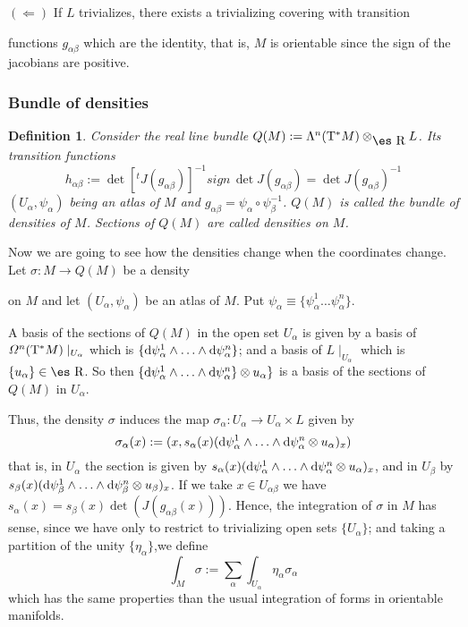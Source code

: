 \documentclass[12pt]{article}
\theoremstyle{plain}
\newtheorem{definition}{Definition}
\def\qed{\ifvmode\removelastskip\fi
{\unskip\nobreak\hfil\penalty50\hbox{}\nobreak\hfil
\hbox{\vrule height1.2ex width1.2ex}\parfillskip=0pt
\finalhyphendemerits=0 \par\smallskip}}
\def\d{{\rm d}}
\def\Real{\mbox{\es R}}
\def\Tan{{\rm T}}
\begin{document}
$(\Longleftarrow)$ \quad
If $L$ trivializes, there exists a trivializing covering with transition

functions
$g_{\alpha \beta}$ which are the identity, that is, $M$ is orientable
since the sign of the jacobians are positive.
\qed


\subsubsection{Bundle of densities}


\begin{definition}
Consider the real line bundle $Q(M) := \Lambda^n(\Tan^* M)
\otimes_{\Real} L$.
Its transition functions
$$
h_{\alpha \beta} :=
\det [^tJ(g_{\alpha \beta})]^{-1} sign\, \det J(g_{\alpha \beta})=
\det J(g_{\alpha \beta})^{-1}
$$
$(U_{\alpha},\psi_{\alpha})$ being an atlas of $M$ and
$g_{\alpha \beta} = \psi_{\alpha} \circ \psi_{\beta}^{-1}$.
$Q(M)$ is called the {\rm bundle of densities} of $M$.
Sections of $Q(M)$ are called {\rm densities} on $M$.
\label{dens}
\end{definition}

Now we are going to see how the densities change
when the coordinates change. Let $\sigma \colon M \to Q(M)$ be a density

on $M$
and let $(U_{\alpha},\psi_{\alpha})$ be an atlas of $M$.
Put $\psi_{\alpha} \equiv \{ \psi_{\alpha}^1 \ldots \psi_{\alpha}^n \}$.

A basis of the sections of $Q(M)$ in the open set $U_{\alpha}$ is given
by
a basis of ${\mit\Omega}^n(\Tan^* M) \mid_{U_{\alpha}}$
which is $\{ \d \psi_{\alpha}^1 \wedge \ldots \wedge \d \psi_{\alpha}^n
\}$;
and a basis of $L \mid_{U_{\alpha}}$ which is $\{ u_{\alpha} \} \in
\Real$.
So then $\{ \d \psi_{\alpha}^1 \wedge \ldots \wedge \d \psi_{\alpha}^n
\}\otimes u_{\alpha} \}$
is a basis of the sections of $Q(M)$ in $U_{\alpha}$.

Thus, the density $\sigma$ induces the map
$\sigma_{\alpha}\colon U_{\alpha} \to U_{\alpha} \times L$
given by
$$
\sigma_{\alpha}(x) :=(x,s_{\alpha}(x)
(\d \psi_{\alpha}^1 \wedge \ldots \wedge \d \psi_{\alpha}^n
\otimes u_{\alpha})_x)
$$
that is, in $U_{\alpha}$ the section is given by
$s_{\alpha}(x) (\d
\psi_{\alpha}^1\wedge\ldots\wedge\d\psi_{\alpha}^n\otimes
u_{\alpha})_x$,
and in $U_{\beta}$ by
 $s_{\beta}(x)(\d \psi_{\beta}^1\wedge
 \ldots\wedge\d\psi_{\beta}^n\otimes u_{\beta})_x$.
If we take $x \in U_{\alpha \beta}$ we have
$s_{\alpha}(x) =s_{\beta}(x) \det (J(g_{\alpha \beta}(x)))$.
Hence, the integration of $\sigma$ in $M$ has sense,
since we have only to restrict to trivializing open sets $\{ U_{\alpha}
\}$;
and taking a partition of the unity $\{ \eta_{\alpha} \}$,we define
$$
\int_M \sigma :=
\sum_{\alpha}\int_{U_{\alpha}} \eta_{\alpha}  \sigma_{\alpha}
$$
which has the same properties than the
usual integration of forms in orientable manifolds.
\end{document}
